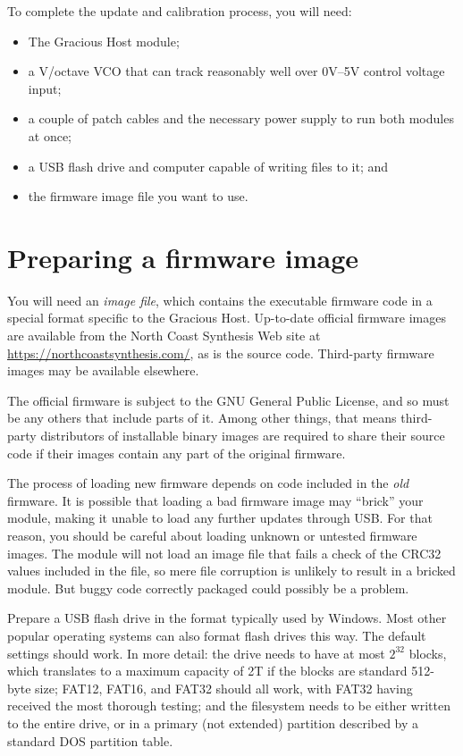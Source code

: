 To complete the update and calibration process, you will need:
\begin{itemize}
  \item The Gracious Host module;
  \item a V/octave VCO that can track reasonably well over 0V--5V control
    voltage input;
  \item a couple of patch cables and the necessary power supply to run both
    modules at once;
  \item a USB flash drive and computer capable of writing files to it; and
  \item the firmware image file you want to use.
\end{itemize}

\section{Preparing a firmware image}

You will need an \emph{image file}, which contains the executable firmware
code in a special format specific to the Gracious Host.  Up-to-date official
firmware images are available from the North Coast Synthesis Web site at
\url{https://northcoastsynthesis.com/}, as is the source code.  Third-party
firmware images may be available elsewhere.

The official firmware is subject to the GNU General Public License, and so
must be any others that include parts of it.  Among other things, that means
third-party distributors of installable binary images are required to
share their source code if their images contain any part of the original
firmware.

The process of loading new firmware depends on code included in the
\emph{old} firmware.  It is possible that loading a bad firmware image may
``brick'' your module, making it unable to load any further updates through
USB.  For that reason, you should be careful about loading unknown or
untested firmware images.  The module will not load an image file that fails
a check of the CRC32 values included in the file, so mere file corruption is
unlikely to result in a bricked module.  But buggy code correctly packaged
could possibly be a problem.

Prepare a USB flash drive in the format typically used by Windows.
Most other popular operating systems can also format flash drives
this way.  The default settings should work.  In more detail: the drive
needs to have at most $2^{32}$ blocks, which translates to a maximum
capacity of 2T if the blocks are standard 512-byte size; FAT12, FAT16, and
FAT32 should all work, with FAT32 having received the most thorough testing;
and the filesystem needs to be either written to the entire drive, or in a
primary (not extended) partition described by a standard DOS partition
table.

